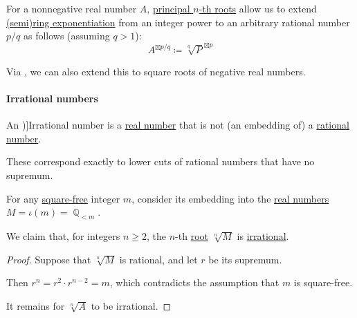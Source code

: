 \begin{definition}\label{def:real_number_rational_exponent}
  For a nonnegative real number \( A \), \hyperref[def:principal_nonnegative_nth_root]{principal \( n \)-th roots} allow us to extend \hyperref[def:semiring/exponentiation]{(semi)ring exponentiation} from an integer power to an arbitrary rational number \( p / q \) as follows (assuming \( q > 1 \)):
  \begin{equation}\label{eq:def:real_number_rational_exponent}
    A^{\boxtimes p / q} \coloneqq \sqrt[q]{ P }^{\boxtimes p}
  \end{equation}
\end{definition}
\begin{comments}
  \item Via , we can also extend this to square roots of negative real numbers.
\end{comments}

\paragraph{Irrational numbers}

\begin{definition}\label{def:irrational_number}
  An \term[ru=иррациональное число (\cite[def. II.1]{Александров1977ОбщаяТопология})]{Irrational number} is a \hyperref[def:real_numbers]{real number} that is not (an embedding of) a \hyperref[def:rational_numbers]{rational number}.
\end{definition}
\begin{comments}
  \item These correspond exactly to lower cuts of rational numbers that have no supremum.
\end{comments}

\begin{proposition}\label{thm:real_nth_root_is_irrational}
  For any \hyperref[def:square_free_element]{square-free} integer \( m \), consider its embedding into the \hyperref[def:real_numbers]{real numbers} \( M = \iota(m) = \BbbQ_{<m} \).

  We claim that, for integers \( n \geq 2 \), the \( n \)-th \hyperref[def:principal_nonnegative_nth_root]{root} \( \sqrt[n]{ M } \) is \hyperref[def:irrational_number]{irrational}.
\end{proposition}
\begin{proof}
  Suppose that \( \sqrt[n]{ M } \) is rational, and let \( r \) be its supremum.

  Then \( r^n = r^2 \cdot r^{n-2} = m \), which contradicts the assumption that \( m \) is square-free.

  It remains for \( \sqrt[n]{ A } \) to be irrational.
\end{proof}

